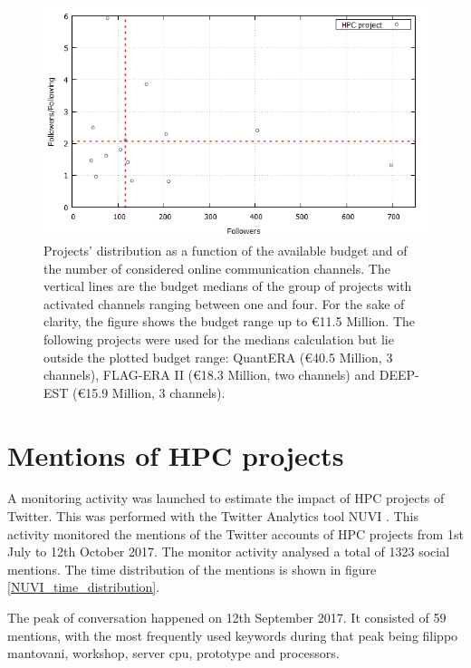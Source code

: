 \begin{figure}[!t] 
 \begin{center}
 \includegraphics[scale=0.4]{Images/HPC_influence.png}
 \caption{Projects' distribution as a function of the available budget and of the number of considered online communication channels. The vertical lines are the budget medians of the group of projects with activated channels ranging between one and four. For the sake of clarity, the figure shows the budget range up to \euro 11.5 Million. The following projects were used for the medians calculation but lie outside the plotted budget range: QuantERA (\euro 40.5 Million, 3 channels), FLAG-ERA II (\euro 18.3 Million, two channels) and DEEP-EST (\euro 15.9 Million, 3 channels).}
 \label{HPC_influence_plot}
 \end{center}
\end{figure}

\section{Mentions of HPC projects} 
A monitoring activity was launched to estimate the impact of HPC projects of Twitter. This was performed with the Twitter Analytics tool NUVI \cite{NUVI}. This activity monitored the mentions of the Twitter accounts of HPC projects from 1st July to 12th October 2017. The monitor activity analysed a total of 1323 social mentions. The time distribution of the mentions is shown in figure \ref{NUVI_time_distribution}.

The peak of conversation happened on 12th September 2017. It consisted of 59 mentions, with the most frequently used keywords during that peak being filippo mantovani, workshop, server cpu, prototype and processors.

